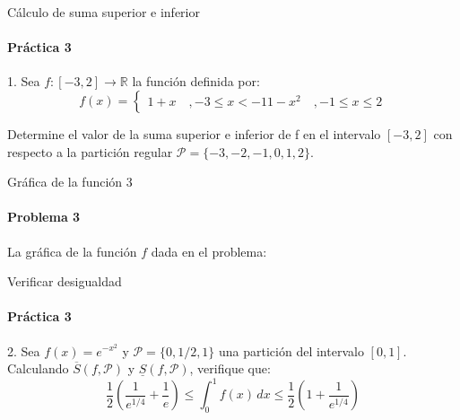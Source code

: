 \documentclass{plantillaPPT}
\begin{document}
\begin{frame}{Cálculo de suma superior e inferior}
\framesubtitle{Práctica 3}

1. Sea \(f:[-3,2]\to\mathbb{R}\) la función definida por:
\[
f(x) = 
\begin{cases}
    1+x \quad ,-3\leq x<-1
    1-x^2 \quad, -1\leq x \leq 2
\end{cases}
\]

Determine el valor de la suma superior e inferior de f en el intervalo \([-3,2]\) con respecto a la partición regular \(\mathcal{P} = \{-3, -2, -1, 0, 1, 2\}\).
    
\end{frame}

\begin{frame}{Gráfica de la función 3}
    \framesubtitle{Problema 3}

La gráfica de la función \(f\) dada en el problema:

\begin{center}
\end{center}
    
\end{frame}

\begin{frame}{Verificar desigualdad}
\framesubtitle{Práctica 3}

2. Sea \(f(x) = e^{-x^2}\) y \(\mathcal{P} = \{0,1/2, 1\}\) una partición del intervalo \([0,1]\). Calculando \(\overline{S}(f, \mathcal{P})\) y \(\underline{S}(f, \mathcal{P})\), verifique que:\\[10pt]

\[\frac{1}{2}\left(\frac{1}{e^{1/4}}+\frac{1}{e}\right) \leq \int_0^1 f(x)\,dx \leq \frac{1}{2}\left(1+\frac{1}{e^{1/4}}\right)\]
    
\end{frame}
\end{document}
